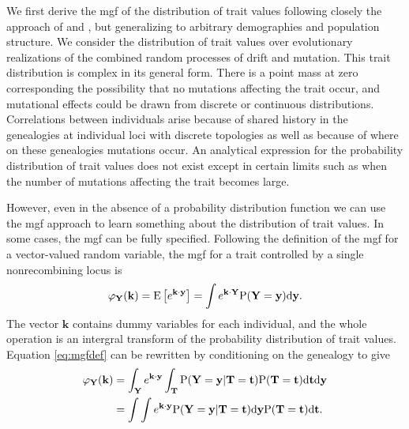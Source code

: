 We first derive the mgf of the distribution of trait values following closely
the approach of \citet{Schraiber2015} and \citet{Khaitovich2005}, but
generalizing to arbitrary demographies and population structure. We consider the
distribution of trait values over evolutionary realizations of the combined
random processes of drift and mutation. This trait distribution is complex in
its general form. There is a point mass at zero corresponding the possibility
that no mutations affecting the trait occur, and mutational effects could be
drawn from discrete or continuous distributions. Correlations between
individuals arise because of shared history in the genealogies at individual
loci with discrete topologies as well as because of where on these genealogies
mutations occur. An analytical expression for the probability distribution of
trait values does not exist except in certain limits such as when the number of
mutations affecting the trait becomes large.

However, even in the absence of a probability distribution function we can use
the mgf approach to learn something about the distribution of trait values. In
some cases, the mgf can be fully specified. Following the definition of the mgf
for a vector-valued random variable, the mgf for a trait controlled by a single
nonrecombining locus is
\begin{equation}
  \label{eq:mgfdef}
  \varphi_{\mathbf{Y}}(\mathbf{k}) = \mathrm{E}\left[ e^{\mathbf{k} \cdot \mathbf{y}} \right] =
  \int e^{\mathbf{k} \cdot \mathbf{Y}} \mathrm{P}(\mathbf{Y}=\mathbf{y}) \mbox{d}\mathbf{y}.
\end{equation}
The vector $\mathbf{k}$ contains dummy variables for each individual, and the
whole operation is an intergral transform of the probability distribution of
trait values. Equation \eqref{eq:mgfdef} can be rewritten by conditioning on the
genealogy to give
\begin{align}
  \label{eq:cond}
  \varphi_{\mathbf{Y}}(\mathbf{k}) &= \int_{\mathbf{Y}} e^{\mathbf{k} \cdot \mathbf{y}}
  \int_{\mathbf{T}} \mathrm{P}(\mathbf{Y}=\mathbf{y} | \mathbf{T}=\mathbf{t}) \mathrm{P}(\mathbf{T}=\mathbf{t})
  \mbox{d}\mathbf{t} \mbox{d}\mathbf{y} \nonumber \\
  &= \int \int e^{\mathbf{k} \cdot \mathbf{y}} \mathrm{P}(\mathbf{Y}=\mathbf{y} | \mathbf{T}=\mathbf{t}) \mbox{d}\mathbf{y}
  \mathrm{P}(\mathbf{T}=\mathbf{t})
  \mbox{d}\mathbf{t}.
\end{align}

